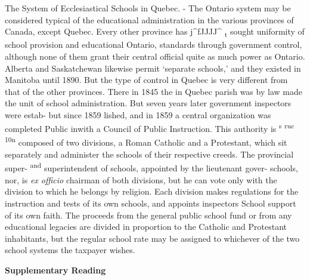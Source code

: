 \documentclass[]{book}
\begin{document}
The System of Ecclesiastical Schools in Quebec. - \protect\hypertarget{ch25.xmlux5cux23para.474.1.0.box.93.248.1275.1452.q.60}{}{ The Ontario system may be considered typical of the educational administration in the various provinces of Canada, except Quebec. Every other province has j\^{}fJJJJ\^{} \textsubscript{t} sought uniformity of school provision and educational Ontario, standards through government control, although none of them grant their central official quite as much power as Ontario. Alberta and Saskatchewan likewise permit `separate schools,' and they existed in Manitoba until 1890. But the type of control in Quebec is very different from that of the other provinces. There in 1845 the in Quebec parish was by law made the unit of school administration. But seven years later government inspectors were estab- but since 1859 lished, and in 1859 a central organization was completed Public inwith a Council of Public Instruction. This authority is \textsuperscript{s} \textsuperscript{ruc} \textsuperscript{10n} composed of two divisions, a Roman Catholic and a Protestant, which sit separately and administer the schools of their respective creeds. The provincial super- \textsuperscript{and} superintendent of schools, appointed by the lieutenant gover- schools, nor, is \emph{ex officio} chairman of both divisions, but he can vote only with the division to which he belongs by religion. Each division makes regulations for the instruction and tests of its own schools, and appoints inspectors School support of its own faith. The proceeds from the general public school fund or from any educational legacies are divided in proportion to the Catholic and Protestant inhabitants, but the regular school rate may be assigned to whichever of the two school systems the taxpayer wishes.}

\textbf{Supplementary Reading}
\end{document}
